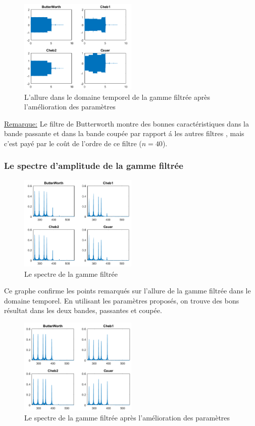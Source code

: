 \documentclass[twoside,twocolumn]{article}
\begin{document}
\begin{figure}[H]
\centering
\includegraphics[width=0.5\textwidth]{Images/6.png}
\caption{ L'allure dans le domaine temporel de la gamme filtrée après l'amélioration des paramètres}
\end{figure}

\underline{Remarque:}
Le filtre de Butterworth montre des bonnes	 caractéristiques dans la bande passante et dans la bande coupée par rapport á les autres filtres , mais c'est payé par le coût de l'ordre de ce filtre ($n=40$).

\subsubsection{Le spectre d'amplitude de la gamme filtrée}

\begin{figure}[H]
\centering
\includegraphics[width=0.5\textwidth]{Images/7.png}
\caption{ Le spectre de la gamme filtrée}
\end{figure}
Ce graphe confirme les points remarqués sur l'allure de la gamme filtrée dans le domaine temporel. 
En utilisant les paramètres proposés, on trouve des bons résultat dans les deux bandes, passantes et coupée.
\begin{figure}[H]
\centering
\includegraphics[width=0.5\textwidth]{Images/8.png}
\caption{ Le spectre de la gamme filtrée après l'amélioration des paramètres}
\end{figure}
\newpage
\end{document}
